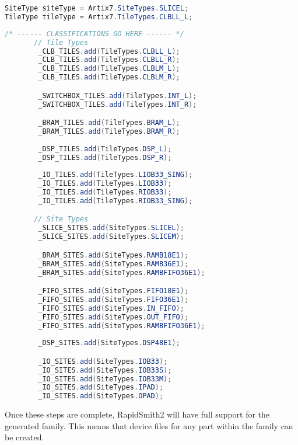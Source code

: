 \begin{lstlisting}[language=java,numbers=none, caption=How to access SiteTypes
and TileTypes in RapidSmith2, label=lst:apdxATypes] 
SiteType siteType = Artix7.SiteTypes.SLICEL; 
TileType tileType = Artix7.TileTypes.CLBLL_L;
\end{lstlisting}

\begin{lstlisting}[language=java,numbers=none, caption=Device classifications
example, label=lst:apdxAClassifications] 
/* ------ CLASSIFICATIONS GO HERE ------ */ 
       // Tile Types
        _CLB_TILES.add(TileTypes.CLBLL_L);
        _CLB_TILES.add(TileTypes.CLBLL_R);
        _CLB_TILES.add(TileTypes.CLBLM_L);
        _CLB_TILES.add(TileTypes.CLBLM_R);

        _SWITCHBOX_TILES.add(TileTypes.INT_L);
        _SWITCHBOX_TILES.add(TileTypes.INT_R);

        _BRAM_TILES.add(TileTypes.BRAM_L);
        _BRAM_TILES.add(TileTypes.BRAM_R);
	
        _DSP_TILES.add(TileTypes.DSP_L);
        _DSP_TILES.add(TileTypes.DSP_R);
	
        _IO_TILES.add(TileTypes.LIOB33_SING);
        _IO_TILES.add(TileTypes.LIOB33);
        _IO_TILES.add(TileTypes.RIOB33);
        _IO_TILES.add(TileTypes.RIOB33_SING);

       // Site Types
        _SLICE_SITES.add(SiteTypes.SLICEL);
        _SLICE_SITES.add(SiteTypes.SLICEM);

        _BRAM_SITES.add(SiteTypes.RAMB18E1);
        _BRAM_SITES.add(SiteTypes.RAMB36E1);
        _BRAM_SITES.add(SiteTypes.RAMBFIFO36E1);

        _FIFO_SITES.add(SiteTypes.FIFO18E1);
        _FIFO_SITES.add(SiteTypes.FIFO36E1);
        _FIFO_SITES.add(SiteTypes.IN_FIFO);
        _FIFO_SITES.add(SiteTypes.OUT_FIFO);
        _FIFO_SITES.add(SiteTypes.RAMBFIFO36E1);
        
        _DSP_SITES.add(SiteTypes.DSP48E1);

        _IO_SITES.add(SiteTypes.IOB33);
        _IO_SITES.add(SiteTypes.IOB33S);
        _IO_SITES.add(SiteTypes.IOB33M);
        _IO_SITES.add(SiteTypes.IPAD);
        _IO_SITES.add(SiteTypes.OPAD);
\end{lstlisting}

\vspace{.3cm}
\noindent Once these steps are complete, RapidSmith2 will have full support for
the generated family. This means that device files for any part within the
family can be created.


